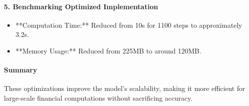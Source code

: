 \documentclass{article}
\begin{document}
    \paragraph{5. Benchmarking Optimized Implementation}

    \begin{itemize}
        \item **Computation Time:** Reduced from 10s for 1100 steps to approximately 3.2s.
        \item **Memory Usage:** Reduced from 225MB to around 120MB.
    \end{itemize}

    \paragraph{Summary}
    These optimizations improve the model's scalability, making it more efficient for large-scale financial computations without sacrificing accuracy.
\end{document}
